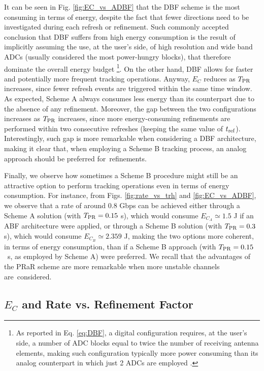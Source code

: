 \documentclass[conference]{IEEEtran}
\begin{document}
It can be seen in Fig. \ref{fig:EC_vs_ADBF} that the DBF scheme is the most consuming in terms of energy, despite the fact that fewer directions need to be investigated during each refresh or refinement. 
Such commonly accepted conclusion that DBF suffers from high energy consumption is the result of implicitly assuming the use, at the user's side, of high resolution and wide band ADCs (usually considered the most power-hungry blocks), that therefore dominate the overall energy budget \cite{Waqas_EW2016}\footnote{As reported in Eq. \eqref{eq:DBF}, a digital configuration requires, at the user's side, a number of ADC blocks equal to twice the number of receiving antenna elements, making such configuration typically more power consuming than its analog counterpart in which just 2 ADCs are employed \cite{Waqas_EW2016}.}.
 On the other hand, DBF allows for faster and potentially more frequent tracking operations. Anyway, $E_C$ reduces as $T_{\rm PR}$ increases, since fewer refresh events are triggered within the same time window.
As expected, Scheme A always consumes less energy than its counterpart due to the absence of any refinement.
Moreover, the gap between the two configurations increases as $T_{\rm PR}$ increases, since more energy-consuming refinements are performed within two consecutive refreshes (keeping the same value of $t_{\rm ref}$). 
Interestingly, such gap is more remarkable when considering a DBF architecture, making it clear that, when employing a Scheme B tracking process, an analog approach should be preferred for~refinements. 


 

Finally, we observe how sometimes a Scheme B  procedure might still be an attractive option to perform tracking operations even in terms of energy consumption. 
For instance, from Figs. \ref{fig:rate_vs_trh} and \ref{fig:EC_vs_ADBF}, we observe that a rate of around $0.8$ Gbps can be achieved either through a Scheme A solution (with $T_{\rm PR} = 0.15$ s), which would consume $E_{C_A}\simeq 1.5$ J if an ABF architecture were applied, or through a Scheme B solution  (with $T_{\rm PR }= 0.3$ s), which would consume $E_{C_B}\simeq 2.359$ J, making the two options more coherent, in terms of energy consumption, than if a Scheme B approach (with $T_{\rm PR}=0.15$~s, as employed by Scheme A) were preferred. 
 We recall that the advantages of the PRaR scheme are  more remarkable when more unstable channels are~considered.

\subsection{$E_C$ and Rate vs. Refinement Factor}
\end{document}

